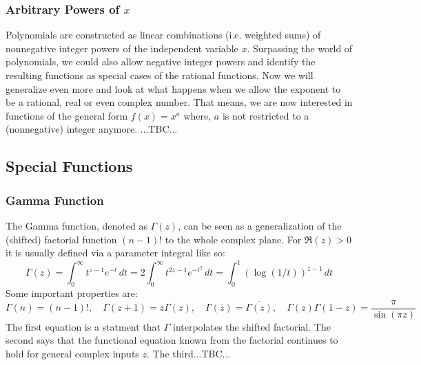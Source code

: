 \subsubsection{Arbitrary Powers of $x$}
Polynomials are constructed as linear combinations (i.e. weighted sums) of nonnegative integer powers of the independent variable $x$. Surpassing the world of polynomials, we could also allow negative integer powers and identify the resulting functions as special cases of the rational functions. Now we will generalize even more and look at what happens when we allow the exponent to be a rational, real or even complex number. That means, we are now interested in functions of the general form $f(x) = x^a$ where, $a$ is not restricted to a (nonnegative) integer anymore. ...TBC...


%


\subsection{Special Functions}

\subsubsection{Gamma Function}
The Gamma function, denoted as $\Gamma(z)$, can be seen as a generalization of the (shifted) factorial function $(n-1)!$ to the whole complex plane. For $\Re(z)>0$ it is usually defined via a parameter integral like so:
\begin{equation}
\Gamma(z) =	\int_{0}^{\infty} t^{z-1} e^{-t} \, dt 
          = 2 \int_{0}^{\infty} t^{2z-1} e^{-t^2} \, dt 
          = \int_{0}^{1} (\log(1/t))^{z-1}  \, dt 	
\end{equation}
Some important properties are:
\begin{equation}
\Gamma(n) = (n-1)!, \quad	
\Gamma(z+1) = z \Gamma(z), \quad
\Gamma(\overline{z}) = \overline{\Gamma(z)}, \quad
\Gamma(z) \Gamma(1-z) = \frac{\pi}{\sin(\pi z)}
\end{equation}
The first equation is a statment that $\Gamma$ interpolates the shifted factorial. The second says that the functional equation known from the factorial continues to hold for general complex inputs $z$. The third...TBC...




